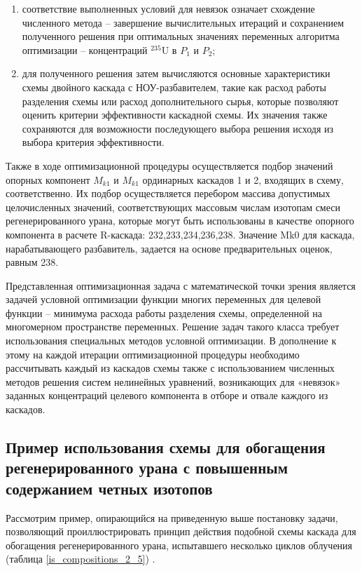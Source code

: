 \begin{enumerate}
    \item соответствие выполненных условий для невязок означает схождение численного метода -- завершение вычислительных итераций и сохранением полученного решения при оптимальных значениях переменных алгоритма оптимизации -- концентраций $^{235}$U в $P_1$ и $P_2$;
    \item для полученного решения затем вычисляются основные характеристики схемы двойного каскада с НОУ-разбавителем, такие как расход работы разделения схемы или расход дополнительного сырья, которые позволяют оценить критерии эффективности каскадной схемы. Их значения также сохраняются для возможности последующего выбора решения исходя из выбора критерия эффективности.
\end{enumerate}

Также в ходе оптимизационной процедуры осуществляется подбор значений опорных компонент $M_{k1}$ и $M_{k1}$ ординарных каскадов 1 и 2, входящих в схему, соответственно. Их подбор осуществляется перебором массива допустимых целочисленных значений, соответствующих массовым числам изотопам смеси регенерированного урана, которые могут быть использованы в качестве опорного компонента в расчете R-каскада: 232,233,234,236,238. Значение $\text{Mk0}$ для каскада, нарабатывающего разбавитель, задается на основе предварительных оценок, равным 238.

Представленная оптимизационная задача с математической точки зрения является задачей условной оптимизации функции многих переменных для целевой функции -- минимума расхода работы разделения схемы, определенной на многомерном пространстве переменных. Решение задач такого класса требует использования специальных методов условной оптимизации. В дополнение к этому на каждой итерации оптимизационной процедуры необходимо рассчитывать каждый из каскадов схемы также с использованием численных методов решения систем нелинейных уравнений, возникающих для «невязок» заданных концентраций целевого компонента в отборе и отвале каждого из каскадов.




\subsection{Пример использования схемы для обогащения регенерированного урана с повышенным содержанием четных изотопов}

Рассмотрим пример, опирающийся на приведенную выше постановку задачи, позволяющий проиллюстрировать принцип действия подобной схемы каскада для обогащения регенерированного урана, испытавшего несколько циклов облучения (таблица \ref{is_compositions_2_5}) \cite{smirnovObogashchenieRegenerirovannogoUrana2018}. 

